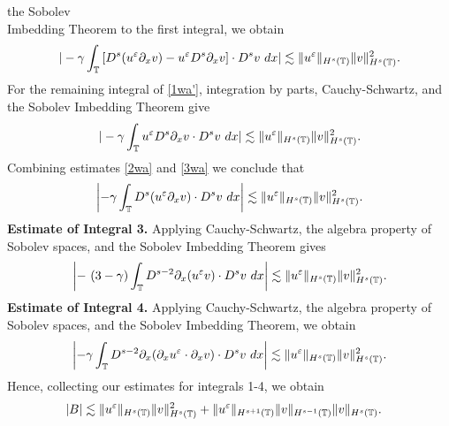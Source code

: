 the Sobolev \\ Imbedding Theorem to 
the first integral, we obtain
%
%
%
%
\begin{equation}
\begin{split}
| -\gamma \int_{\mathbb{T}} \left[ D^s(u^\varepsilon \partial_x v) - u^\varepsilon D^s
\partial_x v \right] \cdot D^s v \ dx |
\lesssim \|u^\varepsilon \|_{H^s(\mathbb{T})} \|v\|_{H^s(\mathbb{T})}^2.
\label{2wa}
\end{split}
\end{equation}
%
%
For the remaining integral of \eqref{1wa'}, integration by parts, 
Cauchy-Schwartz, and the Sobolev Imbedding Theorem give
%
%
\begin{equation}
\begin{split}
| - \gamma \int_{\mathbb{T}} u^\varepsilon D^s \partial_x v \cdot D^s v \ dx |
\lesssim \|u^\varepsilon \|_{H^s(\mathbb{T})} \|v\|_{H^s(\mathbb{T})}^2.
\label{3wa}
\end{split}
\end{equation}
%
%
Combining estimates \eqref{2wa} and \eqref{3wa} we conclude that
%
%
\begin{equation}
\begin{split}
\left | -\gamma \int_{\mathbb{T}} D^s (u^\varepsilon \partial_x v) \cdot D^s v \
dx \right |
 \lesssim \|u^\varepsilon \|_{H^s(\mathbb{T})} \|v\|_{H^s(\mathbb{T})}^2.
\label{4wa}
\end{split}
\end{equation}
%
%
{\bf Estimate of Integral 3.} Applying Cauchy-Schwartz, the 
algebra property of Sobolev spaces, and the Sobolev Imbedding Theorem gives
%
%
\begin{equation}
\begin{split}
\left |- \ ( 3- \gamma) \int_{\mathbb{T}} D^{s-2} \partial_x (u^\varepsilon v) \cdot D^s
v \ dx \right |  \lesssim \|u^\varepsilon\|_{H^{s}(\mathbb{T})} \|v\|_{H^{s}(\mathbb{T})}^2.
\label{13u}
\end{split}
\end{equation}
%
%
%
%
%
%
{\bf Estimate of Integral 4.} Applying Cauchy-Schwartz, the 
algebra property of Sobolev spaces, and the Sobolev Imbedding Theorem, we 
obtain
%
%
\begin{equation*}
\begin{split}
\left |-\gamma \int_{\mathbb{T}} D^{s-2} \partial_x
(\partial_x u^\varepsilon \cdot \partial_x v) \cdot D^s v \
dx \right |
 \lesssim \|u^\varepsilon\|_{H^s(\mathbb{T})} \|v\|_{H^s(\mathbb{T})}^2.
\end{split}
\end{equation*}
%
%
Hence, collecting our estimates for integrals 1-4, we obtain 
%
%
\begin{equation}
\begin{split}
|B| & \lesssim
\|u^\varepsilon\|_{H^s(\mathbb{T})}
\|v\|_{H^s(\mathbb{T})}^2 + \|u^\varepsilon\|_{H^{s+1}(\mathbb{T})}
\|v\|_{H^{s-1}(\mathbb{T})} \|v\|_{H^s(\mathbb{T})}.
\label{14u}
\end{split}
\end{equation}
